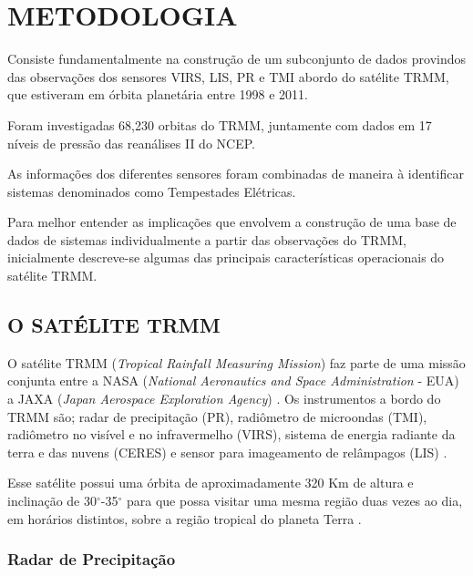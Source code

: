 \chapter{METODOLOGIA}
\label{metodologia}

Consiste fundamentalmente na construção de um subconjunto de dados provindos das observações dos sensores VIRS, LIS, PR e TMI abordo do satélite TRMM, que estiveram em órbita planetária entre 1998 e 2011. 

Foram investigadas 68,230 orbitas do TRMM, juntamente com dados em 17 níveis de pressão das reanálises II do NCEP. 

As informações dos diferentes sensores foram combinadas de maneira à identificar sistemas denominados como Tempestades Elétricas. 

Para melhor entender as implicações que envolvem a construção de uma base de dados de sistemas individualmente a partir das observações do TRMM, inicialmente descreve-se algumas das principais características operacionais do satélite TRMM.

\section{O SATÉLITE TRMM}

O satélite TRMM (\textit{Tropical Rainfall Measuring Mission})  faz parte de uma missão conjunta entre a NASA (\textit{National Aeronautics and Space Administration} - EUA) a JAXA (\textit{Japan Aerospace Exploration Agency}) \cite{simpson1988}. Os instrumentos a bordo do TRMM são; radar de precipitação (PR), radiômetro de microondas (TMI),  radiômetro no visível e no infravermelho (VIRS), sistema de energia radiante da terra e das nuvens (CERES) e sensor para imageamento de relâmpagos (LIS) \cite{kummerok1998}. 


Esse satélite possui uma órbita de aproximadamente 320 Km de altura e inclinação de 30$^{\circ}$-35$^{\circ}$ para que possa visitar uma mesma região duas vezes ao dia, em horários distintos, sobre a região tropical do planeta Terra \cite{simpson1988}.   

\subsection{Radar de Precipitação}

